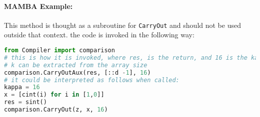 \paragraph{MAMBA Example:} This method is thought as a subroutine for \verb|CarryOut| and should not be used outside that context. the code is invoked in the following way: 
\begin{lstlisting}[language={python}]
from Compiler import comparison
# this is how it is invoked, where res, is the return, and 16 is the kappa
# k can be extracted from the array size
comparison.CarryOutAux(res, [::d -1], 16)
# it could be interpreted as follows when called:
kappa = 16
x = [cint(i) for i in [1,0]]
res = sint()
comparison.CarryOut(z, x, 16)
\end{lstlisting}

\iffalse
\note{Nigel}{Does not seem to be used anywhere}
\msubsubsection{$\mathsf{CarryOutCIn}(\sshare{a}_B,\sshare{b}_B,c,k)$:}
A minor tweak allows us to also input a {\em clear} carry-in
bit into the $\mathsf{CarryOut}$ function.
\begin{enumerate}
\item For $i \in [0,\ldots,k-1]$ do
\begin{enumerate}
	\item $\sshare{d_i}_B \asn (\mathsf{XOR}(\sshare{a_i}, \sshare{b_i}),
	                    \sshare{a_i}\cdot \sshare{b_i})$.
\end{enumerate}
\item $\sshare{g_0} \asn \sshare{g_0}+c \cdot\sshare{p_0}$ [Where $\sshare{d_0}_B=(\sshare{p_0},\sshare{g_0})$].
\item $\sshare{d}_B \asn \mathsf{CarryOutAux}(\sshare{d_{k-1}}_B,\ldots,\sshare{d_0}_B,k)$.
\item $(\sshare{p},\sshare{g}) \asn \sshare{d}_B$.
\item Return $\sshare{g}$.
\end{enumerate}
\fi


